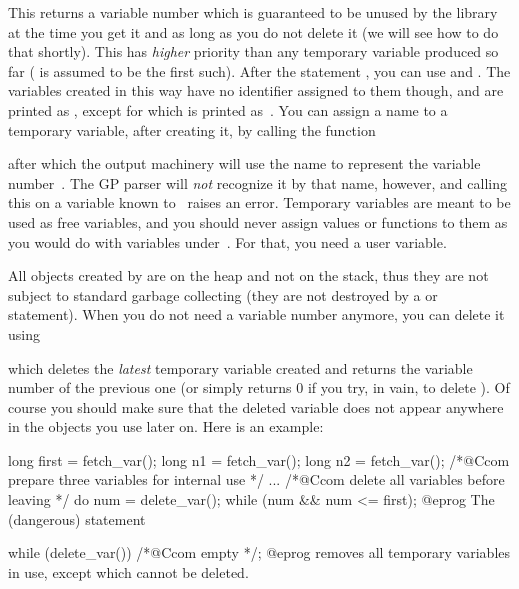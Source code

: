 \label{se:fetch_var}

\noindent
This returns a variable number which is guaranteed to be unused by the
library at the time you get it and as long as you do not delete it (we will
see how to do that shortly). This has \emph{higher} priority than any
temporary variable produced so far ( is assumed to be the first
such). After the statement , you can use
 and . The variables created in this way have no
identifier assigned to them though, and are printed as
, except for  which is printed
as~\kbd{\#}. You can assign a name to a temporary variable, after creating
it, by calling the function


\noindent after which the output machinery will use the name  to
represent the variable number~. The GP parser will \emph{not}
recognize it by that name, however, and calling this on a variable known
to~ raises an error. Temporary variables are meant to be used as free
variables, and you should never assign values or functions to them as you
would do with variables under~. For that, you need a user variable.

All objects created by  are on the heap and not on the stack,
thus they are not subject to standard garbage collecting (they are not
destroyed by a  or  statement). When you do
not need a variable number anymore, you can delete it using


\noindent which deletes the \emph{latest} temporary variable created and
returns the variable number of the previous one (or simply returns 0 if you
try, in vain, to delete ). Of course you should make sure that
the deleted variable does not appear anywhere in the objects you use later
on. Here is an example:

\bprog
  long first = fetch_var();
  long n1 = fetch_var();
  long n2 = fetch_var(); /*@Ccom prepare three variables for internal use */
  ...
  /*@Ccom delete all variables before leaving */
  do { num = delete_var(); } while (num && num <= first);
@eprog\noindent
The (dangerous) statement

\bprog
  while (delete_var()) /*@Ccom empty */;
@eprog\noindent
removes all temporary variables in use, except  which cannot be
deleted.

